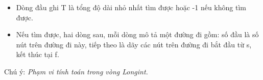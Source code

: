 \begin{itemize}
	\item Dòng đầu ghi T là tổng độ dài nhỏ nhất tìm được hoặc -1 nếu không tìm được.
	\item Nếu tìm được, hai dòng sau, mỗi dòng mô tả một đường đi gồm: số đầu là số nút trên đường đi này, tiếp theo là dãy các nút trên đường đi bắt đầu từ s, kết thúc tại f.
\end{itemize}

Chú ý: \emph{ Phạm vi tính toán trong vòng Longint. }
